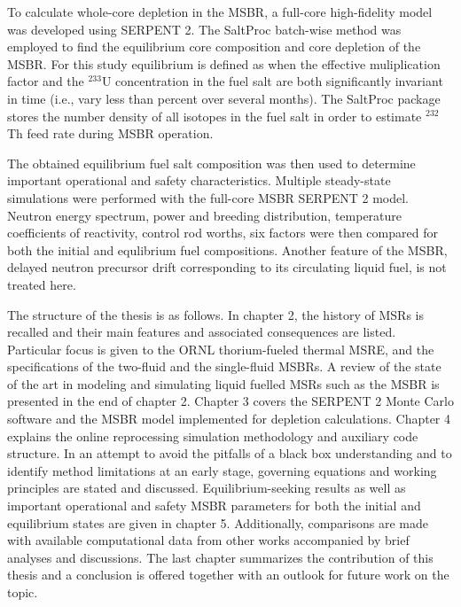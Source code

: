 To calculate whole-core depletion in the \gls{MSBR}, a full-core high-fidelity model was developed using SERPENT 2. The SaltProc batch-wise method was employed to find the equilibrium core composition and core depletion of the \gls{MSBR}. For this study equilibrium is defined as when the effective muliplication factor and the $^{233}$U concentration in the fuel salt are both significantly invariant in time (i.e., vary less than percent over several months). The SaltProc package stores the number density of all isotopes in the fuel salt in order to estimate $^{232}$Th feed rate during \gls{MSBR} operation.

The obtained equilibrium fuel salt composition was then used to determine important operational and safety characteristics. Multiple steady-state simulations were performed with the full-core \gls{MSBR} SERPENT 2 model. Neutron energy spectrum, power and breeding distribution, temperature coefficients of reactivity, control rod worths, six factors were then compared for both the initial and equlibrium fuel compositions.
Another feature of the \gls{MSBR}, delayed neutron precursor drift corresponding to its circulating liquid fuel, is not treated here.

The structure of the thesis is as follows. In chapter 2, the history of \glspl{MSR} is recalled and their main features and associated consequences are listed. Particular focus is given to the \gls{ORNL} thorium-fueled thermal \gls{MSRE}, and the specifications of the two-fluid and the single-fluid \glspl{MSBR}. A review of the state of the art in modeling and simulating liquid fuelled \glspl{MSR} such as the \gls{MSBR} is presented in the end of chapter 2. Chapter 3 covers the SERPENT 2 Monte Carlo software and the \gls{MSBR} model implemented for depletion calculations. Chapter 4 explains the online reprocessing simulation methodology and auxiliary code structure. In an attempt to avoid the pitfalls of a black box understanding and to identify method limitations at an early stage, governing equations and working principles are stated and discussed. Equilibrium-seeking results as well as important operational and safety \gls{MSBR} parameters for both the initial and equilibrium states are given in chapter 5. Additionally,
comparisons are made with available computational data from other works accompanied by brief analyses and discussions. The last chapter summarizes the contribution of this thesis and a conclusion is offered together with an outlook for future work on the topic. 
